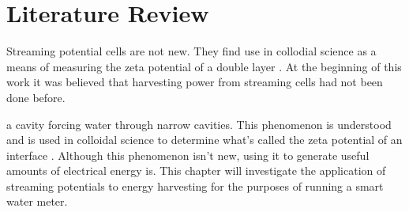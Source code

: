  \section{Literature Review}

    Streaming potential cells are not new.
    They find use in collodial science as a means of measuring the zeta potential of a double layer \cite{Gu2000,Scales1992,Daiguji2004,VanderHeyden2006,Mala1997}.
    At the beginning of this work it was believed that harvesting power from streaming cells had not been done before.




    a cavity forcing water through narrow cavities. This phenomenon is understood
    and is used in colloidal science to determine what's called the zeta potential
    of an interface \cite{Gu2000,Scales1992,Daiguji2004,VanderHeyden2006,Mala1997}.
    Although this phenomenon isn't new, using it to generate useful amounts of
    electrical energy is. This chapter will investigate the application of
    streaming potentials to energy harvesting for the purposes of running a smart
    water meter.



